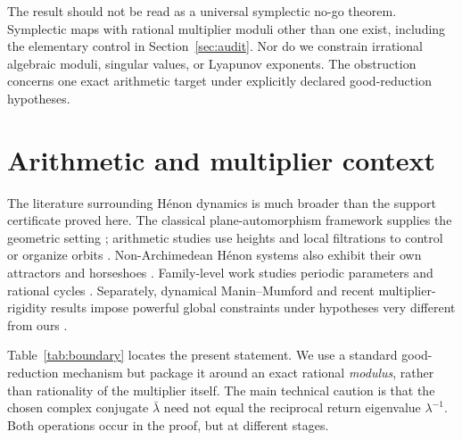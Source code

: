 \documentclass[11pt]{article}
\theoremstyle{definition}
\theoremstyle{remark}
\begin{document}
The result should not be read as a universal symplectic no-go theorem.
Symplectic maps with rational multiplier moduli other than one exist, including
the elementary control in Section~\ref{sec:audit}.  Nor do we constrain
irrational algebraic moduli, singular values, or Lyapunov exponents.  The
obstruction concerns one exact arithmetic target under explicitly declared
good-reduction hypotheses.

\section{Arithmetic and multiplier context}
\label{sec:context}

The literature surrounding H\'enon dynamics is much broader than the support
certificate proved here.  The classical plane-automorphism framework supplies
the geometric setting \citep{friedland_milnor_1989}; arithmetic studies use
heights and local filtrations to control or organize orbits
\citep{silverman_1994,marcello_2003,kawaguchi_2006,kawaguchi_2013,ingram_2014}.
Non-Archimedean H\'enon systems also exhibit their own attractors and
horseshoes \citep{allen_demark_petsche_2018}.  Family-level work studies
periodic parameters and rational cycles
\citep{hsia_kawaguchi_2018,kim_etal_2024}.  Separately, dynamical
Manin--Mumford and recent multiplier-rigidity results impose powerful global
constraints under hypotheses very different from ours
\citep{dujardin_favre_2017,cantat_dujardin_2026_rigidity,cantat_dujardin_2026_multiplier}.

Table~\ref{tab:boundary} locates the present statement.  We use a standard
good-reduction mechanism but package it around an exact rational
\emph{modulus}, rather than rationality of the multiplier itself.  The main
technical caution is that the chosen complex conjugate $\bar\lambda$ need not
equal the reciprocal return eigenvalue $\lambda^{-1}$.  Both operations occur
in the proof, but at different stages.
\end{document}
